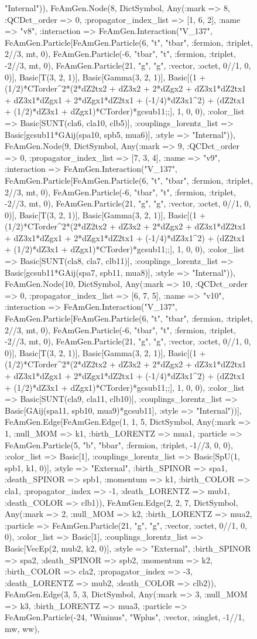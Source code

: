 \documentclass{revtex4}
\begin{document}
\begin{figure}[!htb]
\begin{center}
{"Internal")), FeAmGen.Node(8, Dict{Symbol, Any}(:mark => 8, :QCDct_order => 0, :propagator_index_list => [1, 6, 2], :name => "v8", :interaction => FeAmGen.Interaction("V_137", FeAmGen.Particle[FeAmGen.Particle(6, "t", "tbar", :fermion, :triplet, 2//3, mt, 0), FeAmGen.Particle(-6, "tbar", "t", :fermion, :triplet, -2//3, mt, 0), FeAmGen.Particle(21, "g", "g", :vector, :octet, 0//1, 0, 0)], Basic[T(3, 2, 1)], Basic[Gamma(3, 2, 1)], Basic[(1 + (1/2)*CTorder^2*(2*dZ2tx2 + dZ3x2 + 2*dZgx2 + dZ3x1*dZ2tx1 + dZ3x1*dZgx1 + 2*dZgx1*dZ2tx1 + (-1/4)*dZ3x1^2) + (dZ2tx1 + (1/2)*dZ3x1 + dZgx1)*CTorder)*gcsub11;;], 1, 0, 0), :color_list => Basic[SUNT(cla6, cla10, clb5)], :couplings_lorentz_list => Basic[gcsub11*GAij(spa10, spb5, mua6)], :style => "Internal")), FeAmGen.Node(9, Dict{Symbol, Any}(:mark => 9, :QCDct_order => 0, :propagator_index_list => [7, 3, 4], :name => "v9", :interaction => FeAmGen.Interaction("V_137", FeAmGen.Particle[FeAmGen.Particle(6, "t", "tbar", :fermion, :triplet, 2//3, mt, 0), FeAmGen.Particle(-6, "tbar", "t", :fermion, :triplet, -2//3, mt, 0), FeAmGen.Particle(21, "g", "g", :vector, :octet, 0//1, 0, 0)], Basic[T(3, 2, 1)], Basic[Gamma(3, 2, 1)], Basic[(1 + (1/2)*CTorder^2*(2*dZ2tx2 + dZ3x2 + 2*dZgx2 + dZ3x1*dZ2tx1 + dZ3x1*dZgx1 + 2*dZgx1*dZ2tx1 + (-1/4)*dZ3x1^2) + (dZ2tx1 + (1/2)*dZ3x1 + dZgx1)*CTorder)*gcsub11;;], 1, 0, 0), :color_list => Basic[SUNT(cla8, cla7, clb11)], :couplings_lorentz_list => Basic[gcsub11*GAij(spa7, spb11, mua8)], :style => "Internal")), FeAmGen.Node(10, Dict{Symbol, Any}(:mark => 10, :QCDct_order => 0, :propagator_index_list => [6, 7, 5], :name => "v10", :interaction => FeAmGen.Interaction("V_137", FeAmGen.Particle[FeAmGen.Particle(6, "t", "tbar", :fermion, :triplet, 2//3, mt, 0), FeAmGen.Particle(-6, "tbar", "t", :fermion, :triplet, -2//3, mt, 0), FeAmGen.Particle(21, "g", "g", :vector, :octet, 0//1, 0, 0)], Basic[T(3, 2, 1)], Basic[Gamma(3, 2, 1)], Basic[(1 + (1/2)*CTorder^2*(2*dZ2tx2 + dZ3x2 + 2*dZgx2 + dZ3x1*dZ2tx1 + dZ3x1*dZgx1 + 2*dZgx1*dZ2tx1 + (-1/4)*dZ3x1^2) + (dZ2tx1 + (1/2)*dZ3x1 + dZgx1)*CTorder)*gcsub11;;], 1, 0, 0), :color_list => Basic[SUNT(cla9, cla11, clb10)], :couplings_lorentz_list => Basic[GAij(spa11, spb10, mua9)*gcsub11], :style => "Internal"))], FeAmGen.Edge[FeAmGen.Edge(1, 1, 5, Dict{Symbol, Any}(:mark => 1, :null_MOM => k1, :birth_LORENTZ => mua1, :particle => FeAmGen.Particle(5, "b", "bbar", :fermion, :triplet, -1//3, 0, 0), :color_list => Basic[1], :couplings_lorentz_list => Basic[SpU(1, spb1, k1, 0)], :style => "External", :birth_SPINOR => spa1, :death_SPINOR => spb1, :momentum => k1, :birth_COLOR => cla1, :propagator_index => -1, :death_LORENTZ => mub1, :death_COLOR => clb1)), FeAmGen.Edge(2, 2, 7, Dict{Symbol, Any}(:mark => 2, :null_MOM => k2, :birth_LORENTZ => mua2, :particle => FeAmGen.Particle(21, "g", "g", :vector, :octet, 0//1, 0, 0), :color_list => Basic[1], :couplings_lorentz_list => Basic[VecEp(2, mub2, k2, 0)], :style => "External", :birth_SPINOR => spa2, :death_SPINOR => spb2, :momentum => k2, :birth_COLOR => cla2, :propagator_index => -3, :death_LORENTZ => mub2, :death_COLOR => clb2)), FeAmGen.Edge(3, 5, 3, Dict{Symbol, Any}(:mark => 3, :null_MOM => k3, :birth_LORENTZ => mua3, :particle => FeAmGen.Particle(-24, "Wminus", "Wplus", :vector, :singlet, -1//1, mw, ww), }
\end{center}
\end{figure}
\end{document}
